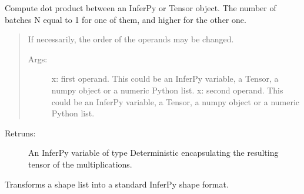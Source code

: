 \documentclass[letterpaper,10pt,english]{sphinxmanual}
\begin{document}
\begin{fulllineitems}
\label{\detokenize{modules/inferpy.util:inferpy.util.ops.dot}}
Compute dot product between an InferPy or Tensor object. The number of batches N equal to 1
for one of them, and higher for the other one.
\begin{quote}

If necessarily, the order of the operands may be changed.
\begin{description}
\item[{Args:}] \leavevmode
x: first operand. This could be an InferPy variable, a Tensor, a numpy object or a numeric Python list.
x: second operand. This could be an InferPy variable, a Tensor, a numpy object or a numeric Python list.

\end{description}
\end{quote}
\begin{description}
\item[{Retruns:}] \leavevmode
An InferPy variable of type Deterministic encapsulating the resulting tensor
of the multiplications.

\end{description}

\end{fulllineitems}


\begin{fulllineitems}
\label{\detokenize{modules/inferpy.util:inferpy.util.ops.fix_shape}}
Transforms a shape list into a standard InferPy shape format.

\end{fulllineitems}

\end{document}
